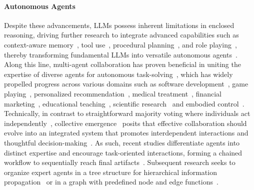 \documentclass{article}
\begin{document}
\paragraph{Autonomous Agents}
Despite these advancements, LLMs possess inherent limitations in enclosed reasoning, driving further research to integrate advanced capabilities such as context-aware memory~\citep{park2023generative,hua2023war}, tool use~\citep{schick2023toolformer,qin2023toolllm}, procedural planning~\citep{Wang2023Plan,Zelikman2024Quiet}, and role playing~\citep{chan2023chateval,Wang2024Unleashing,Liu2024Training}, thereby transforming fundamental LLMs into versatile autonomous agents~\citep{AutoGPT,shinn2024reflexion,zhao2024expel,Lin2023SwiftSage,Mei2024AIOS,Chu2024Professional}.
Along this line, multi-agent collaboration has proven beneficial in uniting the expertise of diverse agents for autonomous task-solving~\citep{Khan2024Debating,Liang2024Encouraging,qian2023communicative,Wang2024Rethinking,Wang2024Learning,Zhou2024Symbolic,Talebirad2023Multi,Chen2024CoMM,Li2023MetaAgents}, which has widely propelled progress across various domains such as software development~\citep{hong2023metagpt,qian2023experiential}, game playing~\citep{Vinyals2019Grandmaster}, personalized recommendation~\citep{wang2023recagent,zhang2023generative}, medical treatment~\citep{Tang2023MedAgents,Li2024AgentHospital}, financial marketing~\citep{Gao2024Simulating,EconAgent}, educational teaching~\citep{zheyuan2024simulating,Yu2024From}, scientific research~\citep{Zeng2024ChatMol,ResearchAgent,Ghafarollahi2024SciAgents} and embodied control~\citep{Guo2024Embodied,Chen2024Scalable,mandi2023roco}.
Technically, in contrast to straightforward majority voting where individuals act independently~\citep{chen2024are}, collective emergence~\citep{woolley2010evidence,Hopfield1982Neural,Watts1998Collective} posits that effective collaboration should evolve into an integrated system that promotes interdependent interactions and thoughtful decision-making~\citep{li2024more,piatti2024cooperate}.
As such, recent studies differentiate agents into distinct expertise and encourage task-oriented interactions, forming a chained workflow to sequentially reach final artifacts~\citep{qian2023communicative}. Subsequent research seeks to organize expert agents in a tree structure for hierarchical information propagation~\citep{chen2023agentverse} or in a graph with predefined node and edge functions~\citep{zhuge2024language}.
\end{document}
